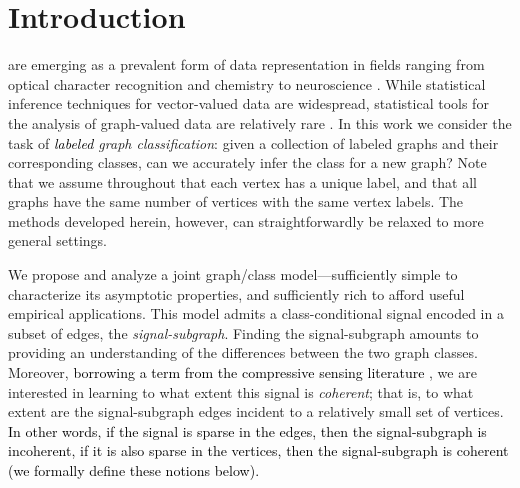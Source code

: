 \documentclass[10pt,journal,cspaper,compsoc]{IEEEtran}
\providecommand{\tk}[1]{\textcolor{black}{#1}}
\newcommand{\comment}[1]{}
\begin{document}
\maketitle
\IEEEdisplaynotcompsoctitleabstractindextext
\IEEEpeerreviewmaketitle



\section{Introduction} \label{sec:intro}

 are emerging as a prevalent form of data representation in fields ranging from optical character recognition and chemistry \cite{Bunke2011} to neuroscience \cite{Hagmann2010}.  While statistical inference techniques for vector-valued data are widespread, statistical tools for the analysis of graph-valued data are relatively rare \cite{Bunke2011}. In this work we consider the task of \emph{\tk{labeled} graph classification}: given a collection of labeled graphs and their corresponding class\tk{es}\comment{labels}, can we accurately infer the class\comment{label} for a new graph?  Note that we assume throughout that each vertex has a unique label, and that all graphs have the same number of vertices with the same vertex labels. The methods developed herein, however, can straightforwardly be relaxed to more general settings.

We propose and analyze a joint graph/class model---sufficiently simple to characterize its asymptotic properties, and sufficiently rich to afford useful empirical applications.  This model admits a class-conditional signal encoded in a subset of edges, the \emph{signal-subgraph}. Finding the signal-subgraph amounts to providing an understanding of the differences between the two graph classes.  Moreover,
\tk{borrowing a term from the compressive sensing literature \cite{Donoho2006, Candes2008}}, 
 we are interested in learning to what extent this signal is \emph{coherent}; that is, to what extent are the signal-subgraph edges incident to a relatively small set of vertices. \tk{In other words, if the signal is sparse in the edges, then the signal-subgraph is incoherent, if it is also sparse in the vertices, then the signal-subgraph is coherent (we formally define these notions below).} \comment{If the signal-subgraph is strongly coherent, this suggests that the signal is carried by a few important vertices in the graph; otherwise, the signal is more widely distributed across the graph, with no particularly special vertices. }
\end{document}

